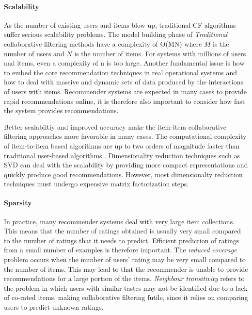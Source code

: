 \paragraph{Scalability}

As the number of existing users and items blow up, traditional CF algorithms
suffer serious scalability problems. The model building phase of
\emph{Traditional} collaborative filtering methods have a complexity of O(MN)
where $M$ is the number of users and $N$ is the number of items. For systems
with millions of users and items, even a complexity of n is too large. Another
fundamental issue is how to embed the core recommendation techniques in real
operational systems and how to deal with massive and dynamic sets of data
produced by the interactions of users with items. Recommender systems are
expected in many cases to provide rapid recommendations online, it is therefore
also important to consider how fast the system provides recommendations.

Better scalabiltiy and improved accuracy make the item-item collaborative
filtering approaches more favorable in many cases. The computational complexity
of item-to-item based algorithms are up to two orders of magnitude faster than
traditional user-based algorithms \cite{Deshpande2004}. Dimensionality
reduction techniques such as SVD can deal with the scalability by providing
more compact representations and quickly produce good recommendations. However,
most dimensionalty reduction techniques must undergo expensive matrix
factorization steps.

\paragraph{Sparsity}

In practice, many recommender systems deal with very large item collections.
This means that the number of ratings obtained is usually very small compared
to the number of ratings that it needs to predict. Efficient prediction of
ratings from a small number of examples is therefore important. The
\emph{reduced coverage} problem occurs when the number of users' rating may be
very small compared to the number of items. This may lead to that the
recommender is unable to provide recommendations for a large portion of the
items. \emph{Neighbour transitivity} refers to the problem in which users with
similar tastes may not be identified due to a lack of co-rated items, making
collaborative filtering futile, since it relies on comparing users to predict
unknown ratings. \linebreak[4]

